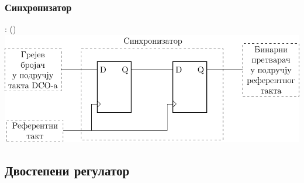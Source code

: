 \documentclass[aspectratio=169]{beamer}
\begin{document}
\subsubsection{Синхронизатор}

\begin{frame}{\secname: \subsecname (\subsubsecname)}
	\centering
	\includegraphics[scale=0.9]{slike/prezentacija/syncronizer.pdf}
\end{frame}

\subsection{Двостепени регулатор}
\end{document}
